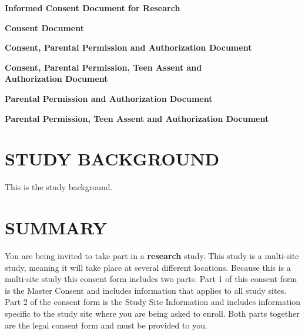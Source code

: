 \documentclass[11pt]{article}
\begin{document}
\begin{center}

{%
\textbf{\Large Informed Consent Document for Research}
}%
{}%

{%
\textbf{\Large Consent Document}
}%
{}%

{%
\textbf{\Large Consent, Parental Permission and Authorization Document}
}%
{}%

{%
\textbf{\Large Consent, Parental Permission, Teen Assent and} \\
\textbf{\Large Authorization Document}
}%
{}%

{%
\textbf{\Large Parental Permission and Authorization Document}
}%
{}%

{%
\textbf{\Large Parental Permission, Teen Assent and Authorization Document}
}%
{}%
\end{center}


\section{STUDY BACKGROUND}

This is the study background.

\section{SUMMARY}
\label{sec:summary}
You are being invited to take part in a \textbf{research} study. This study is a multi-site study, meaning it will take place
at several different locations. Because this is a multi-site study this consent form includes two parts. Part 1 of
this consent form is the Master Consent and includes information that applies to all study sites. Part 2 of the
consent form is the Study Site Information and includes information specific to the study site where you are being
asked to enroll. Both parts together are the legal consent form and must be provided to you.
\end{document}
